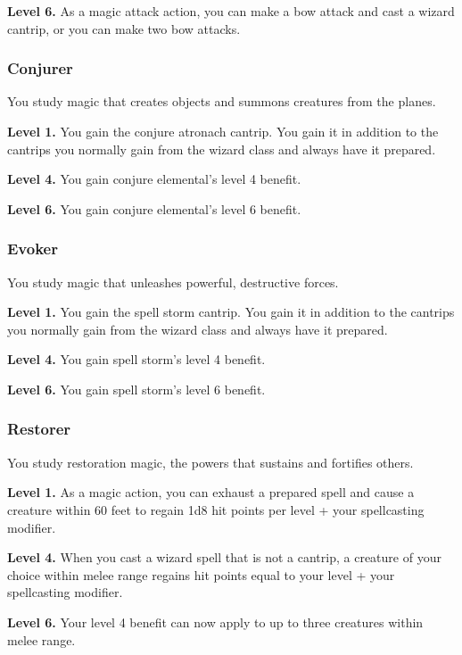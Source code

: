 \documentclass[12pt,letterpaper,twocolumn,openany,nodeprecatedcode,bg=none]{dndbook}
\begin{document}
\textbf{Level 6.} As a magic attack action, you can make a bow attack
and cast a wizard cantrip, or you can make two bow attacks.

\subsubsection{Conjurer}\label{conjurer}

You study magic that creates objects and summons creatures from the
planes.

\textbf{Level 1.} You gain the conjure atronach cantrip. You gain it in
addition to the cantrips you normally gain from the wizard class and
always have it prepared.

\textbf{Level 4.} You gain conjure elemental's level 4 benefit.

\textbf{Level 6.} You gain conjure elemental's level 6 benefit.

\subsubsection{Evoker}\label{evoker}

You study magic that unleashes powerful, destructive forces.

\textbf{Level 1.} You gain the spell storm cantrip. You gain it in
addition to the cantrips you normally gain from the wizard class and
always have it prepared.

\textbf{Level 4.} You gain spell storm's level 4 benefit.

\textbf{Level 6.} You gain spell storm's level 6 benefit.

\subsubsection{Restorer}\label{restorer}

You study restoration magic, the powers that sustains and fortifies
others.

\textbf{Level 1.} As a magic action, you can exhaust a prepared spell
and cause a creature within 60 feet to regain 1d8 hit points per level +
your spellcasting modifier.

\textbf{Level 4.} When you cast a wizard spell that is not a cantrip, a
creature of your choice within melee range regains hit points equal to
your level + your spellcasting modifier.

\textbf{Level 6.} Your level 4 benefit can now apply to up to three
creatures within melee range.
\end{document}

